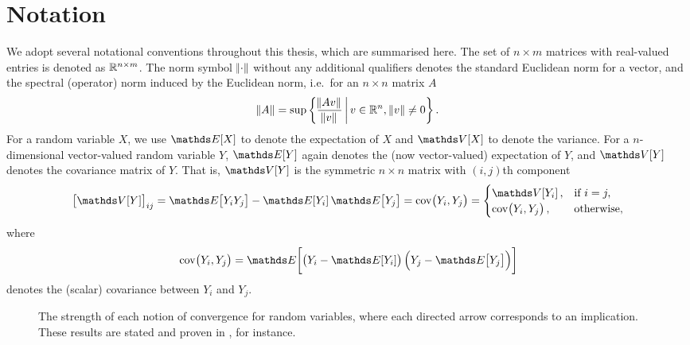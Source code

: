 \section{Notation}
We adopt several notational conventions throughout this thesis, which are summarised here.
The set of \(n \times m\) matrices with real-valued entries is denoted as \(\mathbb{R}^{n\times m}\).
The norm symbol \(\norm{\cdot}\) without any additional qualifiers denotes the standard Euclidean norm for a vector, and the spectral (operator) norm induced by the Euclidean norm, i.e.\ for an \(n \times n\) matrix \(A\)
\[
	\norm{A} = \sup\left\{\frac{\norm{Av}}{\norm{v}}\,\middle|\,v \in \mathbb{R}^n, \, \norm{v} \neq 0\right\}.
\]
For a random variable \(X\), we use \(\avg{X}\) to denote the expectation of \(X\) and \(\var{X}\) to denote the variance.
For a \(n\)-dimensional vector-valued random variable \(Y\), \(\avg{Y}\) again denotes the (now vector-valued) expectation of \(Y\), and \(\var{Y}\) denotes the covariance matrix of \(Y\).
That is, \(\var{Y}\) is the symmetric \(n\times n\) matrix with \((i,j)\)th component
\[
	\left[\var{Y}\right]_{ij} = \avg{Y_iY_j} - \avg{Y_i}\avg{Y_j} = \cov{Y_i, Y_j} = \begin{cases}
		\var{Y_i},      & \text{if } i = j, \\
		\cov{Y_i, Y_j}, & \text{otherwise},
	\end{cases}
\]
where
\[
	\cov{Y_i, Y_j} = \avg{\left(Y_i - \avg{Y_i}\right)\left(Y_j - \avg{Y_j}\right)}
\]
denotes the (scalar) covariance between \(Y_i\) and \(Y_j\).

\begin{figure}
	\begin{center}
		\caption{The strength of each notion of convergence for random variables, where each directed arrow corresponds to an implication.
			These results are stated and proven in \citet{Bremaud_2020_ProbabilityTheoryStochastic}, for instance.}
		\label{fig:rv_conv_impl}
	\end{center}
\end{figure}

